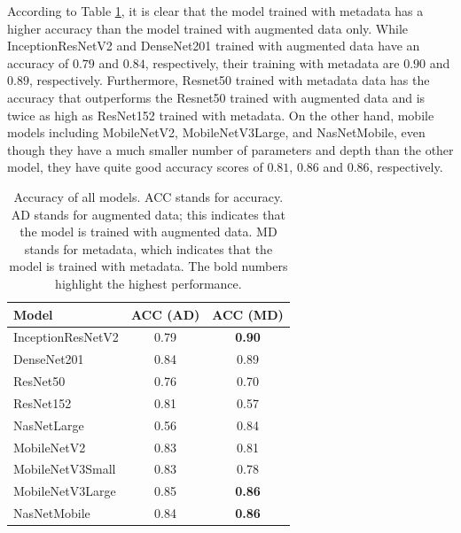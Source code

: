 \documentclass[sensors,article,accept,pdftex,moreauthors]{Definitions/mdpi}
\begin{document}
	According to Table \ref{table:overall-acc}, it is clear that the model trained with metadata has a higher accuracy than the model trained with augmented data only. While InceptionResNetV2 and DenseNet201 trained with augmented data have an accuracy of $0.79$ and $0.84$, respectively, their training with metadata are $0.90$ and $0.89$, respectively. Furthermore, Resnet50 trained with metadata data has the accuracy that outperforms the Resnet50 trained with augmented data and is twice as high as ResNet152 trained with metadata. On the other hand, mobile models including MobileNetV2, MobileNetV3Large, and NasNetMobile, even though they have a much smaller number of parameters and depth than the other model, they have quite good accuracy scores of $0.81$, $0.86$ and $0.86$, respectively. 
	
	\begin{table}[H]
		\caption{Accuracy of all models. ACC stands for accuracy. AD stands for augmented data; this indicates that the model is trained with augmented data. MD stands for metadata, which indicates that the model is trained with metadata. The bold numbers highlight the highest performance.}
		\label{table:overall-acc}
		\setlength{\tabcolsep}{12.38mm}\begin{tabular}{ l  c  c  }
\toprule
\textbf{Model} & \textbf{ACC (AD)} & \textbf{ACC (MD)}\\ 
\midrule
InceptionResNetV2 & 0.79 & \textbf{{0.90} %
}\\
\midrule
DenseNet201 & 0.84 & 0.89\\
\midrule
ResNet50 & 0.76 & 0.70\\
\midrule
ResNet152 & 0.81 & 0.57\\
\midrule
NasNetLarge & 0.56 & 0.84\\
\midrule
MobileNetV2 & 0.83 & 0.81\\
\midrule
MobileNetV3Small & 0.83 & 0.78\\
\midrule
MobileNetV3Large & 0.85 & \textbf{0.86}\\
\midrule
NasNetMobile & 0.84 & \textbf{0.86}\\
\bottomrule
		\end{tabular}
	\end{table}
	
\end{document}
